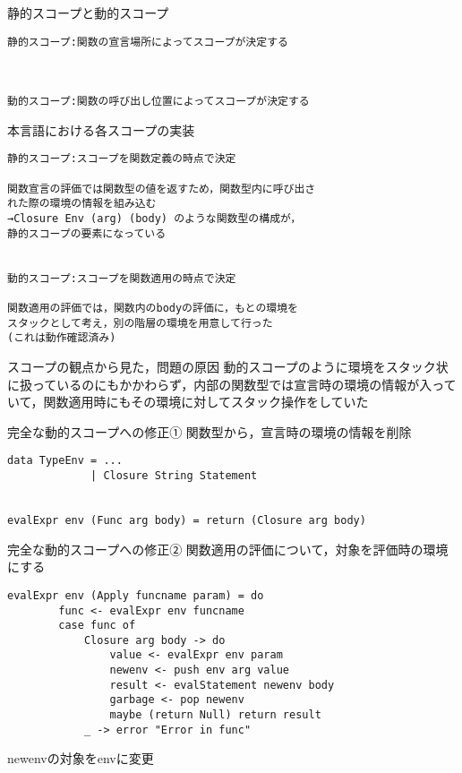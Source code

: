 \documentclass[uplatex,dvipdfmx,ja=standard]{beamer}
\begin{document}
\begin{frame}[fragile]{静的スコープと動的スコープ}
    \begin{verbatim}
静的スコープ:関数の宣言場所によってスコープが決定する



動的スコープ:関数の呼び出し位置によってスコープが決定する
    \end{verbatim}
\end{frame}

\begin{frame}[fragile]{本言語における各スコープの実装}
    \begin{verbatim}
静的スコープ:スコープを関数定義の時点で決定

関数宣言の評価では関数型の値を返すため，関数型内に呼び出さ
れた際の環境の情報を組み込む
→Closure Env (arg) (body) のような関数型の構成が，
静的スコープの要素になっている


動的スコープ:スコープを関数適用の時点で決定

関数適用の評価では，関数内のbodyの評価に，もとの環境を
スタックとして考え，別の階層の環境を用意して行った
(これは動作確認済み)
    \end{verbatim}
\end{frame}

\begin{frame}{スコープの観点から見た，問題の原因}
動的スコープのように環境をスタック状に扱っているのにもかかわらず，内部の関数型では宣言時の環境の情報が入っていて，関数適用時にもその環境に対してスタック操作をしていた
\end{frame}

\begin{frame}[fragile]{完全な動的スコープへの修正①}
関数型から，宣言時の環境の情報を削除
    \begin{verbatim}
data TypeEnv = ...
             | Closure String Statement


evalExpr env (Func arg body) = return (Closure arg body) 
    \end{verbatim}
\end{frame}


\begin{frame}[fragile]{完全な動的スコープへの修正②}
関数適用の評価について，対象を評価時の環境にする
    \begin{verbatim}
evalExpr env (Apply funcname param) = do 
        func <- evalExpr env funcname
        case func of 
            Closure arg body -> do
                value <- evalExpr env param 
                newenv <- push env arg value
                result <- evalStatement newenv body
                garbage <- pop newenv
                maybe (return Null) return result
            _ -> error "Error in func"
    \end{verbatim}
newenvの対象をenvに変更
\end{frame}
\end{document}
